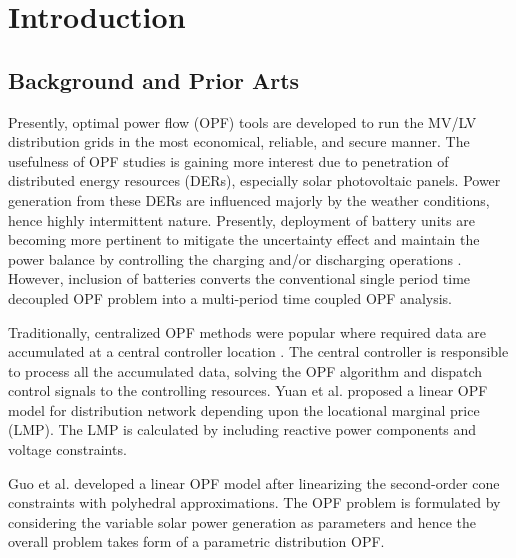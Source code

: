 \documentclass{article}
\begin{document}
\section{Introduction}

\subsection{Background and Prior Arts}
Presently, optimal power flow (OPF) tools are developed to run the MV/LV distribution grids in the most economical, reliable, and secure manner. The usefulness of OPF studies is gaining more interest due to penetration of distributed energy resources (DERs), especially solar photovoltaic panels. Power generation from these DERs are influenced majorly by the weather conditions, hence highly intermittent nature. Presently, deployment of battery units are becoming more pertinent to mitigate the uncertainty effect and maintain the power balance by controlling the charging and/or discharging operations \cite{tgangwar}. However, inclusion of batteries converts the conventional single period time decoupled OPF problem into a multi-period time coupled OPF analysis.

Traditionally, centralized OPF methods were popular where required data are accumulated at a central controller location \cite{spaul}. The central controller is responsible to process all the accumulated data, solving the OPF algorithm and dispatch control signals to the controlling resources. Yuan et al. \cite{Yuan} proposed a linear OPF model for distribution network depending upon the locational marginal price (LMP). The LMP is calculated by including reactive power components and voltage constraints. 

Guo et al. \cite{Guo} developed a linear OPF model after linearizing the second-order cone constraints with polyhedral approximations. The OPF problem is formulated by considering the variable solar power generation as parameters and hence the overall problem takes form of a parametric distribution OPF. 
\end{document}
